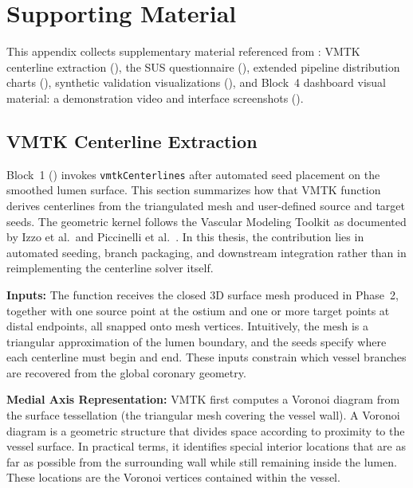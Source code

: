 \chapter{Supporting Material}
\label{app:supporting-material}

This appendix collects supplementary material referenced from : VMTK centerline extraction (), the SUS questionnaire (), extended pipeline distribution charts (), synthetic validation visualizations (), and Block~4 dashboard visual material: a demonstration video and interface screenshots ().

\section{VMTK Centerline Extraction}
\label{app:vmtk-centerlines}

Block~1 () invokes \texttt{vmtkCenterlines} after automated seed placement on the smoothed lumen surface. This section summarizes how that VMTK function derives centerlines from the triangulated mesh and user-defined source and target seeds. The geometric kernel follows the Vascular Modeling Toolkit as documented by Izzo et al.\ and Piccinelli et al.~\cite{izzo2018,piccinelli2009}. In this thesis, the contribution lies in automated seeding, branch packaging, and downstream integration rather than in reimplementing the centerline solver itself.

\noindent\textbf{Inputs:} The function receives the closed 3D surface mesh produced in Phase~2, together with one source point at the ostium and one or more target points at distal endpoints, all snapped onto mesh vertices. Intuitively, the mesh is a triangular approximation of the lumen boundary, and the seeds specify where each centerline must begin and end. These inputs constrain which vessel branches are recovered from the global coronary geometry.

\noindent\textbf{Medial Axis Representation:} VMTK first computes a Voronoi diagram from the surface tessellation (the triangular mesh covering the vessel wall). A Voronoi diagram is a geometric structure that divides space according to proximity to the vessel surface. In practical terms, it identifies special interior locations that are as far as possible from the surrounding wall while still remaining inside the lumen. These locations are the Voronoi vertices contained within the vessel.

